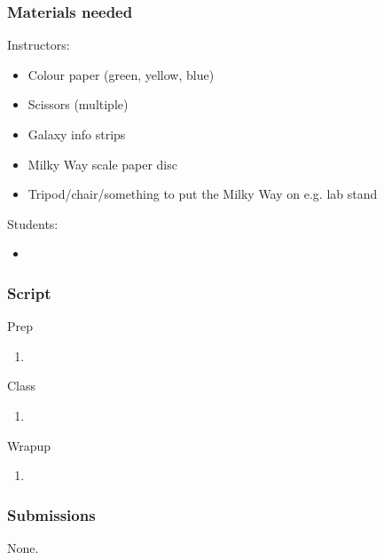 \documentclass[12pt]{article}
\begin{document}
\subsubsection{Materials needed}
Instructors:
\begin{itemize}
  \item Colour paper (green, yellow, blue)
  \item Scissors (multiple)
  \item Galaxy info strips
  \item Milky Way scale paper disc
  \item Tripod/chair/something to put the Milky Way on e.g. lab stand
\end{itemize}
Students:
\begin{itemize}
  \item 
\end{itemize}

\subsubsection{Script}
Prep
\begin{enumerate}
\item
\end{enumerate}
Class
\begin{enumerate}
\item
\end{enumerate}
Wrapup
\begin{enumerate}
\item
\end{enumerate}

\subsubsection{Submissions}
None.
\end{document}
